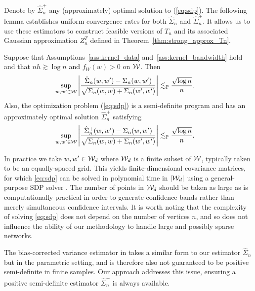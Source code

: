 Denote by $\hat\Sigma_n^+$ any (approximately) optimal solution to
(\ref{eq:sdp}). The following lemma establishes uniform convergence rates
for both $\hat \Sigma_n$ and $\hat \Sigma_n^+$. It allows us to use
these estimators to construct feasible versions of $T_n$ and its associated
Gaussian approximation $Z_n^{T}$ defined in Theorem~\ref{thm:strong_approx_Tn}.
%
\begin{lemma}
  \label{lem:sdp}
  Suppose that Assumptions~\ref{ass:kernel_data}
  and~\ref{ass:kernel_bandwidth} hold
  and that
  $n h \gtrsim \log n$ and
  $f_W(w) > 0$ on $\mathcal{W}$.
  Then
  \begin{align*}
    \sup_{w,w' \in \mathcal{W}}
    \left|
    \frac{\hat \Sigma_n(w,w') - \Sigma_n(w,w')}
    {\sqrt{\Sigma_n(w,w) + \Sigma_n(w',w')}}
    \right|
    &\lesssim_{\mathbb{P}}
    \frac{\sqrt{\log n}}{n}.
  \end{align*}
  Also, the optimization problem (\ref{eq:sdp})
  is a semi-definite program
  \citep[SDP,][]{laurent2005semidefinite}
  and has an approximately
  optimal solution
  $\hat\Sigma_n^+$
  satisfying
  \begin{align*}
    \sup_{w,w' \in \mathcal{W}}
    \left|
    \frac{\hat \Sigma_n^+(w,w') - \Sigma_n(w,w')}
    {\sqrt{\Sigma_n(w,w) + \Sigma_n(w',w')}}
    \right|
    &\lesssim_{\mathbb{P}}
    \frac{\sqrt{\log n}}{n}.
  \end{align*}
\end{lemma}

In practice we take $w, w' \in \mathcal{W}_d$ where $\mathcal{W}_d$ is a finite
subset of $\mathcal{W}$, typically taken to be an equally-spaced grid.
This yields finite-dimensional covariance matrices,
for which \eqref{eq:sdp}
can be solved in polynomial time in $|\mathcal{W}_d|$ using
a general-purpose SDP solver
\citep[e.g.\ by interior point methods,][]{laurent2005semidefinite}.
The number of points in $\mathcal{W}_d$ should be taken as large as is
computationally practical in order to generate
confidence bands rather than merely simultaneous confidence intervals.
It is worth noting that the complexity of solving \eqref{eq:sdp}
does not depend on the number of vertices $n$,
and so does not influence the ability
of our methodology to handle large and possibly sparse networks.

The bias-corrected variance estimator in
\citet[Section~3.2]{MatsushitaOtsu2021} takes a similar form
to our estimator $\hat\Sigma_n$ but in the parametric setting,
and is therefore also not guaranteed
to be positive semi-definite in finite samples.
Our approach addresses this issue,
ensuring a positive semi-definite estimator
$\hat\Sigma_n^+$ is always available.

